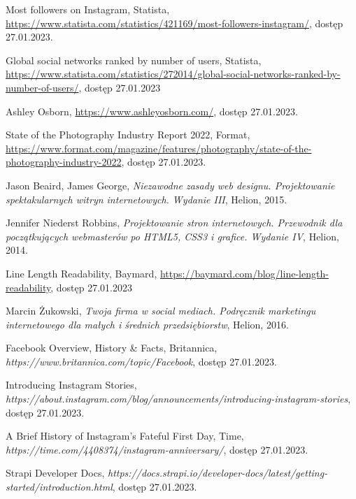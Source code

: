\documentclass[12pt]{article}
\numberwithin{figure}{section}
\begin{document}
\begin{sloppypar}
\begin{thebibliography}{99}
    Most followers on Instagram, Statista,
    \url{https://www.statista.com/statistics/421169/most-followers-instagram/},
    dostęp 27.01.2023.

    Global social networks ranked by number of users, Statista,
    \url{https://www.statista.com/statistics/272014/global-social-networks-ranked-by-number-of-users/},
    dostęp 27.01.2023

    Ashley Osborn,
    \url{https://www.ashleyosborn.com/},
    dostęp 27.01.2023.

    State of the Photography Industry Report 2022, Format,
    \url{https://www.format.com/magazine/features/photography/state-of-the-photography-industry-2022},
    dostęp 27.01.2023.

    Jason Beaird, James George,
    \textit{Niezawodne zasady web designu. Projektowanie spektakularnych witryn internetowych. Wydanie III},
    Helion,
    2015.

    Jennifer Niederst Robbins,
    \textit{Projektowanie stron internetowych. Przewodnik dla początkujących webmasterów po HTML5, CSS3 i grafice. Wydanie IV},
    Helion,
    2014.

    Line Length Readability, Baymard,
    \url{https://baymard.com/blog/line-length-readability},
    dostęp 27.01.2023

    Marcin Żukowski,
    \textit{Twoja firma w social mediach. Podręcznik marketingu internetowego dla małych i średnich przedsiębiorstw},
    Helion,
    2016.

    Facebook Overview, History \& Facts, Britannica,
    \textit{https://www.britannica.com/topic/Facebook},
    dostęp 27.01.2023.

    Introducing Instagram Stories,
    \textit{https://about.instagram.com/blog/announcements/introducing-instagram-stories},
    dostęp 27.01.2023.

    A Brief History of Instagram's Fateful First Day, Time,
    \textit{https://time.com/4408374/instagram-anniversary/},
    dostęp 27.01.2023.

    Strapi Developer Docs,
    \textit{https://docs.strapi.io/developer-docs/latest/getting-started/introduction.html},
    dostęp 27.01.2023.
        
\end{thebibliography}

\end{sloppypar}
\end{document}

